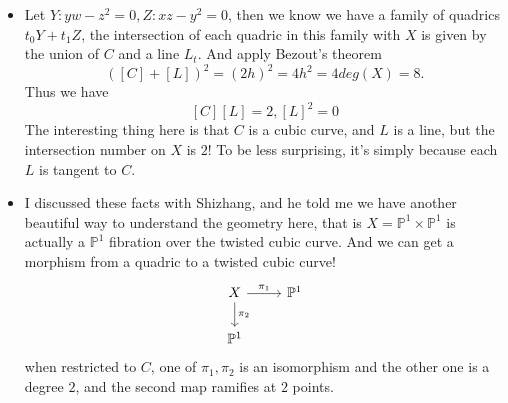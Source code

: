 \documentclass[../main.tex]{subfiles}
\begin{document}
\begin{example}
\begin{itemize}
\item Let $Y:yw-z^{2}=0, Z:xz-y^{2}=0$, then we know we have a family of quadrics $t_{0}Y+t_{1}Z$, the intersection of each quadric in this family with $X$ is given by the union of $C$ and a line $L_{t}$. And apply Bezout's theorem
$$([C]+[L])^{2}=(2h)^{2}=4h^{2}=4deg(X)=8.$$
Thus we have 
$$[C][L]=2, [L]^{2}=0$$
The interesting thing here is that $C$ is a cubic curve, and $L$ is a line, but the intersection number on $X$ is $2$! To be less surprising, it's simply because each $L$ is tangent to $C$.
\item I discussed these facts with Shizhang, and he told me we have another beautiful way to understand the geometry here, that is $X=\mathbb{P}^{1}\times \mathbb{P}^{1}$ is actually a $\mathbb{P}^{1}$ fibration over the twisted cubic curve. And we can get a morphism from a quadric to a twisted cubic curve! 
$$\begin{tikzcd} X\arrow{d}{\pi_{2}}\arrow{r}{\pi_{1}} & \mathbb{P}^{1}\\
\mathbb{P}^{1} \end{tikzcd}$$
when restricted to $C$, one of $\pi_{1}, \pi_{2}$ is an isomorphism and the other one is a degree $2$, and the second map ramifies at $2$ points.
\end{itemize}
\end{example}
\end{document}
